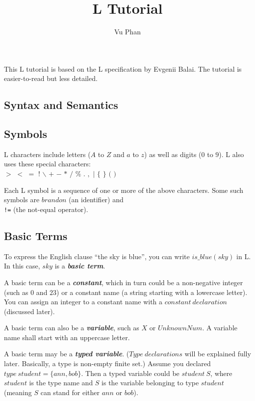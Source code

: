 \documentclass[letterpaper,10pt]{article}
\title{L Tutorial}
\author{Vu Phan}
\def\st{\noindent}
\begin{document}
\maketitle
\st
\setcounter{tocdepth}{2}

This L tutorial is based on the L specification by Evgenii Balai. The tutorial is easier-to-read but less detailed.

\tableofcontents

\setlength{\parskip}{\baselineskip}
\pagebreak


\begin{flushleft}


\section{Syntax and Semantics}


\subsection{Symbols}\label{symbols}

L characters include letters ($A$ to $Z$ and $a$ to $z$) as well as digits ($0$ to $9$). L also uses these special characters:\\
$>$ $<$ $=$ $!$ $\backslash$ $+$ $-$ $*$ $/$  $\%$  $.$ $,$ $|$ $\{$ $\}$ $($ $)$

Each L symbol is a sequence of one or more of the above characters. Some such symbols are $brandon$ (an identifier) and \\ \texttt{!=} (the not-equal operator).

\subsection{Basic Terms}

To express the English clause ``the sky is blue'', you can write $is\_blue(sky)$ in L. In this case, $sky$ is a \textbf{\textit{basic term}}.

A basic term can be a \textbf{\textit{constant}}, which in turn could be a non-negative integer (such as $0$ and $23$) or a constant name (a string starting with a lowercase letter). You can assign an integer to a constant name with a $constant~declaration$ (discussed later).

A basic term can also be a \textbf{\textit{variable}}, such as $X$ or $UnknownNum$. A variable name shall start with an uppercase letter.

A basic term may be a \textbf{\textit{typed variable}}. ($Type~declarations$ will be explained fully later. Basically, a type is non-empty finite set.) Assume you declared $type~student=\{ann,bob\}$. Then a typed variable could be $student~S$, where $student$ is the type name and $S$ is the variable belonging to type $student$ (meaning $S$ can stand for either $ann$ or $bob$).


\end{flushleft}
\end{document}
